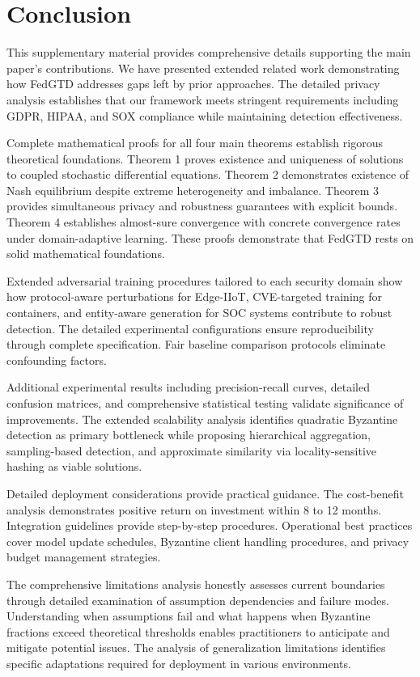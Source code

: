 \documentclass[12pt,a4paper]{article}
\theoremstyle{definition}
\begin{document}
\section{Conclusion}

This supplementary material provides comprehensive details supporting the main paper's contributions. We have presented extended related work demonstrating how FedGTD addresses gaps left by prior approaches. The detailed privacy analysis establishes that our framework meets stringent requirements including GDPR, HIPAA, and SOX compliance while maintaining detection effectiveness.

Complete mathematical proofs for all four main theorems establish rigorous theoretical foundations. Theorem 1 proves existence and uniqueness of solutions to coupled stochastic differential equations. Theorem 2 demonstrates existence of Nash equilibrium despite extreme heterogeneity and imbalance. Theorem 3 provides simultaneous privacy and robustness guarantees with explicit bounds. Theorem 4 establishes almost-sure convergence with concrete convergence rates under domain-adaptive learning. These proofs demonstrate that FedGTD rests on solid mathematical foundations.

Extended adversarial training procedures tailored to each security domain show how protocol-aware perturbations for Edge-IIoT, CVE-targeted training for containers, and entity-aware generation for SOC systems contribute to robust detection. The detailed experimental configurations ensure reproducibility through complete specification. Fair baseline comparison protocols eliminate confounding factors.

Additional experimental results including precision-recall curves, detailed confusion matrices, and comprehensive statistical testing validate significance of improvements. The extended scalability analysis identifies quadratic Byzantine detection as primary bottleneck while proposing hierarchical aggregation, sampling-based detection, and approximate similarity via locality-sensitive hashing as viable solutions.

Detailed deployment considerations provide practical guidance. The cost-benefit analysis demonstrates positive return on investment within 8 to 12 months. Integration guidelines provide step-by-step procedures. Operational best practices cover model update schedules, Byzantine client handling procedures, and privacy budget management strategies.

The comprehensive limitations analysis honestly assesses current boundaries through detailed examination of assumption dependencies and failure modes. Understanding when assumptions fail and what happens when Byzantine fractions exceed theoretical thresholds enables practitioners to anticipate and mitigate potential issues. The analysis of generalization limitations identifies specific adaptations required for deployment in various environments.
\end{document}

